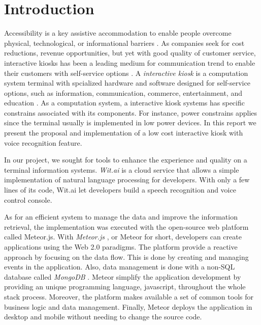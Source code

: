 %
\chapter{Introduction}
\label{sec:intro}


Accessibility is a key assistive accommodation to enable people  overcome physical, technological, or informational barriers \cite{acessguide13}.
As companies seek for cost reductions, revenue opportunities, but yet with good quality of customer service, interactive kiosks has been a leading  medium for communication trend to enable their customers with self-service options \cite{abi16}.
A \emph{interactive kiosk} is a computation system terminal with spcialized hardware and software designed for self-service options, such as information, communication, commerce, entertainment, and education \cite{satish2012money}.
As a computation system, a interactive kiosk systems has specific constrains associated with its components.
For instance, power constrains applies since the terminal usually is implemented in low power devices.
In this report we present the proposal and implementation of a low cost interactive kiosk with voice recognition feature.


In our project, we sought for tools to enhance the experience and quality on a terminal information systems.
\emph{Wit.ai} \cite{1_wit.ai_2016} is a cloud service that allows a simple implementation of natural language processing for developers.
With only a few lines of its code, Wit.ai let developers build a speech recognition and voice control console.


As for an efficient system to manage the data and improve the information retrieval, the implementation was executed with the open-source web platform called Meteor.js.
With \emph{Meteor.js} \cite{meteor}, or Meteor for short, developers can create applications using the Web 2.0 paradigms.
The platform provide a reactive approach by focusing on the data flow.
This is done by creating and managing events in the application.
Also, data management is done with a non-SQL database called \emph{MongoDB} \citep{mongo}.
Meteor simplify the application development by providing an unique programming language, javascript, throughout the whole stack process.
Moreover, the platform makes available a set of common tools for business logic and data management.
Finally, Meteor deploys the application in desktop and mobile without needing to change the source code.


